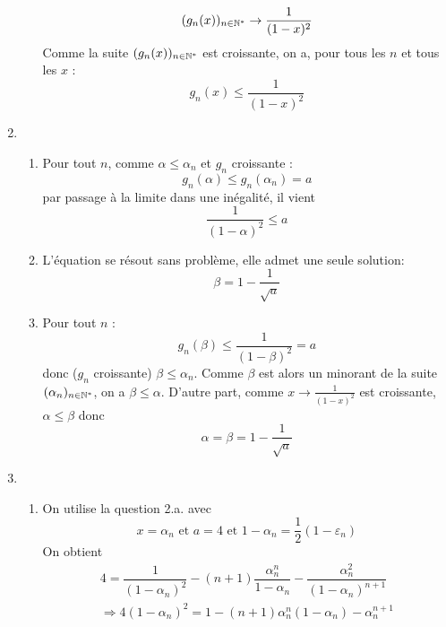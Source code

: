 \begin{enumerate}
\begin{enumerate}
\begin{displaymath}
 (g_n(x))_{n\in \mathbb{N}^*}\rightarrow \dfrac{1}{(1-x)^2}
\end{displaymath}
Comme la suite $(g_n(x))_{n\in \mathbb{N}^*}$ est croissante, on a, pour tous les $n$ et tous les $x$ :
\begin{displaymath}
 g_n(x)\leq \dfrac{1}{(1-x)^2}
\end{displaymath}
\end{enumerate}
\item \begin{enumerate}
 \item Pour tout $n$, comme $\alpha \leq \alpha_n$ et $g_n$ croissante :
\begin{displaymath}
 g_n(\alpha) \leq g_n(\alpha_n) = a
\end{displaymath}
par passage à la limite dans une inégalité, il vient
\begin{displaymath}
 \dfrac{1}{(1-\alpha)^2}\leq a
\end{displaymath}
\item  L'équation se résout sans problème, elle admet une seule solution:
\begin{displaymath}
 \beta = 1 - \dfrac{1}{\sqrt{a}}
\end{displaymath}
\item Pour tout $n$ :
\begin{displaymath}
 g_n(\beta)\leq \dfrac{1}{(1-\beta)^2}= a
\end{displaymath}
donc ($g_n$ croissante) $\beta \leq \alpha_n$. Comme $\beta$ est alors un minorant de la suite $(\alpha_n)_{n\in \mathbb{N}^*}$, on a $\beta\leq \alpha$. D'autre part, comme $x\rightarrow \frac{1}{(1-x)^2}$ est croissante, $\alpha \leq \beta$ donc
\begin{displaymath}
 \alpha = \beta = 1-\frac{1}{\sqrt{a}}
\end{displaymath}
\end{enumerate}
\item \begin{enumerate}
 \item On utilise la question 2.a. avec
\begin{displaymath}
 x=\alpha_n \text{ et } a=4 \text{ et } 1-\alpha_n = \dfrac{1}{2}(1-\varepsilon_n)
\end{displaymath}
On obtient
\begin{multline*}
 4 = \dfrac{1}{(1-\alpha_n)^2} - (n+1)\dfrac{\alpha_n^n}{1-\alpha_n}-\dfrac{\alpha_n^2}{(1-\alpha_n)^{n+1}}\\
\Rightarrow 4(1-\alpha_n)^2 = 1 -(n+1)\alpha_n^n(1-\alpha_n)-\alpha_n^{n+1} \\

\end{multline*}
\end{enumerate}
\end{enumerate}

